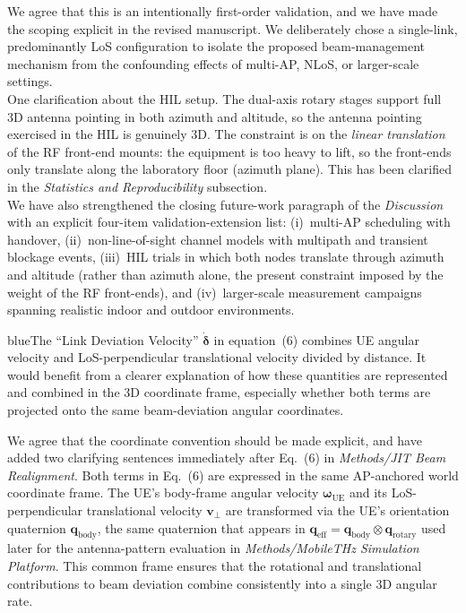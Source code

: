 \documentclass{article}
\newcommand{\blue}[1]{\begin{color}{blue}#1\end{color}}
\begin{document}
\noindent We agree that this is an intentionally first-order validation, and we have made the scoping explicit in the revised manuscript. We deliberately chose a single-link, predominantly LoS configuration to isolate the proposed beam-management mechanism from the confounding effects of multi-AP, NLoS, or larger-scale settings.\\

\noindent One clarification about the HIL setup. The dual-axis rotary stages support full 3D antenna pointing in both azimuth and altitude, so the antenna pointing exercised in the HIL is genuinely 3D. The constraint is on the \emph{linear translation} of the RF front-end mounts: the equipment is too heavy to lift, so the front-ends only translate along the laboratory floor (azimuth plane). This has been clarified in the \emph{Statistics and Reproducibility} subsection.\\

\noindent We have also strengthened the closing future-work paragraph of the \emph{Discussion} with an explicit four-item validation-extension list: (i)~multi-AP scheduling with handover, (ii)~non-line-of-sight channel models with multipath and transient blockage events, (iii)~HIL trials in which both nodes translate through azimuth and altitude (rather than azimuth alone, the present constraint imposed by the weight of the RF front-ends), and (iv)~larger-scale measurement campaigns spanning realistic indoor and outdoor environments.

\begin{tcbremark}
{\selectfont
\blue{The ``Link Deviation Velocity'' $\dot{\boldsymbol\delta}$ in equation~(6) combines UE angular velocity and LoS-perpendicular translational velocity divided by distance. It would benefit from a clearer explanation of how these quantities are represented and combined in the 3D coordinate frame, especially whether both terms are projected onto the same beam-deviation angular coordinates.}
}
\end{tcbremark}

\noindent We agree that the coordinate convention should be made explicit, and have added two clarifying sentences immediately after Eq.~(6) in \emph{Methods/JIT Beam Realignment}. Both terms in Eq.~(6) are expressed in the same AP-anchored world coordinate frame. The UE's body-frame angular velocity $\boldsymbol\omega_{\text{UE}}$ and its LoS-perpendicular translational velocity $\mathbf{v}_\perp$ are transformed via the UE's orientation quaternion $\mathbf{q}_{\text{body}}$, the same quaternion that appears in $\mathbf{q}_{\text{eff}} = \mathbf{q}_{\text{body}} \otimes \mathbf{q}_{\text{rotary}}$ used later for the antenna-pattern evaluation in \emph{Methods/MobileTHz Simulation Platform}. This common frame ensures that the rotational and translational contributions to beam deviation combine consistently into a single 3D angular rate.
\end{document}
